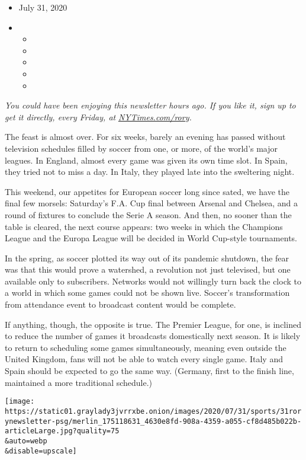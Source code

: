\begin{itemize}
\item
  July 31, 2020
\item
  \begin{itemize}
  \item
  \item
  \item
  \item
  \item
  \end{itemize}
\end{itemize}

\emph{You could have been enjoying this newsletter hours ago. If you
like it, sign up to get it directly, every Friday, at}
\href{https://www.nytimes3xbfgragh.onion/newsletters/rory-smith?smid=rd}{\emph{NYTimes.com/rory}}\emph{.}

The feast is almost over. For six weeks, barely an evening has passed
without television schedules filled by soccer from one, or more, of the
world's major leagues. In England, almost every game was given its own
time slot. In Spain, they tried not to miss a day. In Italy, they played
late into the sweltering night.

This weekend, our appetites for European soccer long since sated, we
have the final few morsels: Saturday's F.A. Cup final between Arsenal
and Chelsea, and a round of fixtures to conclude the Serie A season. And
then, no sooner than the table is cleared, the next course appears: two
weeks in which the Champions League and the Europa League will be
decided in World Cup-style tournaments.

In the spring, as soccer plotted its way out of its pandemic shutdown,
the fear was that this would prove a watershed, a revolution not just
televised, but one available only to subscribers. Networks would not
willingly turn back the clock to a world in which some games could not
be shown live. Soccer's transformation from attendance event to
broadcast content would be complete.

If anything, though, the opposite is true. The Premier League, for one,
is inclined to reduce the number of games it broadcasts domestically
next season. It is likely to return to scheduling some games
simultaneously, meaning even outside the United Kingdom, fans will not
be able to watch every single game. Italy and Spain should be expected
to go the same way. (Germany, first to the finish line, maintained a
more traditional schedule.)

\texttt{[image: https://static01.graylady3jvrrxbe.onion/images/2020/07/31/sports/31rorynewsletter-psg/merlin\_175118631\_4630e8fd-908a-4359-a055-cf8d485b022b-articleLarge.jpg?quality=75\\\&auto=webp\\\&disable=upscale]}

